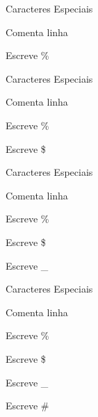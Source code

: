 \begin{frame}{Caracteres Especiais}
	\begin{description}[maiortextodomundoqueconsigoes]
		\item [{\code \%}]    Comenta linha
		\item [{\code \textbackslash \%}]    Escreve \%
	\end{description}
\end{frame}

\begin{frame}{Caracteres Especiais}
	\begin{description}[maiortextodomundoqueconsigoes]
		\item [{\code \%}]    Comenta linha
		\item [{\code \textbackslash \%}]    Escreve \%
		\item [{\code \textbackslash \$}]    Escreve \$
	\end{description}
\end{frame}


\begin{frame}{Caracteres Especiais}
	\begin{description}[maiortextodomundoqueconsigoes]
		\item [{\code \%}]    Comenta linha
		\item [{\code \textbackslash \%}]    Escreve \%
		\item [{\code \textbackslash \$}]    Escreve \$
		\item [{\code \textbackslash \_}]    Escreve \_
	\end{description}
\end{frame}

\begin{frame}{Caracteres Especiais}
	\begin{description}[maiortextodomundoqueconsigoes]
		\item [{\code \%}]    Comenta linha
		\item [{\code \textbackslash \%}]    Escreve \%
		\item [{\code \textbackslash \$}]    Escreve \$
		\item [{\code \textbackslash \_}]    Escreve \_
		\item [{\code \textbackslash \#}]    Escreve \#
	\end{description}
\end{frame}


